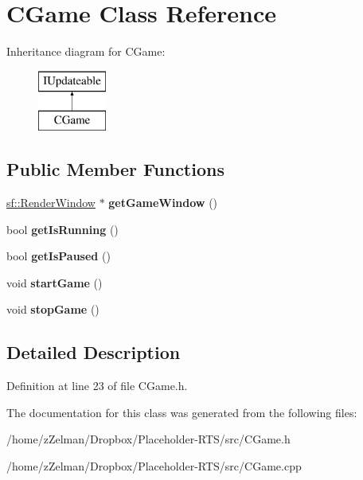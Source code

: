 \hypertarget{classCGame}{\section{C\-Game Class Reference}
\label{classCGame}
}
Inheritance diagram for C\-Game\-:\begin{figure}[H]
\begin{center}
\leavevmode
\includegraphics[height=2.000000cm]{classCGame}
\end{center}
\end{figure}
\subsection*{Public Member Functions}
\begin{DoxyCompactItemize}
\item 
\hypertarget{classCGame_a9ed0bb7ef800bc7e568cf8858c3b96ec}{\hyperlink{classsf_1_1RenderWindow}{sf\-::\-Render\-Window} $\ast$ {\bfseries get\-Game\-Window} ()}\label{classCGame_a9ed0bb7ef800bc7e568cf8858c3b96ec}

\item 
\hypertarget{classCGame_ae45938d7b77b13d2e80e4f9b3a17a44a}{bool {\bfseries get\-Is\-Running} ()}\label{classCGame_ae45938d7b77b13d2e80e4f9b3a17a44a}

\item 
\hypertarget{classCGame_a9b2f241693b1f024c957f92069fe6ed7}{bool {\bfseries get\-Is\-Paused} ()}\label{classCGame_a9b2f241693b1f024c957f92069fe6ed7}

\item 
\hypertarget{classCGame_aa94f04e2c012603f10430a4d4db3ce27}{void {\bfseries start\-Game} ()}\label{classCGame_aa94f04e2c012603f10430a4d4db3ce27}

\item 
\hypertarget{classCGame_acbad86ee58748e2db0da540f4aa0640e}{void {\bfseries stop\-Game} ()}\label{classCGame_acbad86ee58748e2db0da540f4aa0640e}

\end{DoxyCompactItemize}


\subsection{Detailed Description}


Definition at line 23 of file C\-Game.\-h.



The documentation for this class was generated from the following files\-:\begin{DoxyCompactItemize}
\item 
/home/z\-Zelman/\-Dropbox/\-Placeholder-\/\-R\-T\-S/src/C\-Game.\-h\item 
/home/z\-Zelman/\-Dropbox/\-Placeholder-\/\-R\-T\-S/src/C\-Game.\-cpp\end{DoxyCompactItemize}
